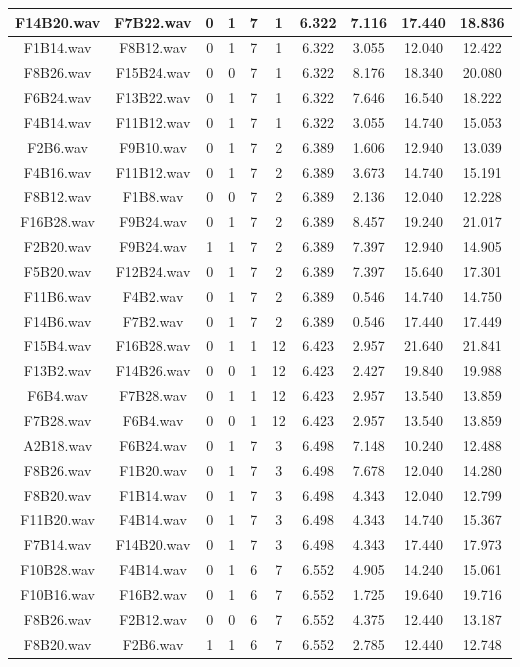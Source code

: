 \documentclass[11pt,a4paper]{book}
\begin{document}
\begin{longtable}[c]{|c|c|c|c|c|c|c|c|c|c|}
F14B20.wav&F7B22.wav&0&1&7&1&6.322&7.116&17.440&18.836\\ \hline
F1B14.wav&F8B12.wav&0&1&7&1&6.322&3.055&12.040&12.422\\ \hline
F8B26.wav&F15B24.wav&0&0&7&1&6.322&8.176&18.340&20.080\\ \hline
F6B24.wav&F13B22.wav&0&1&7&1&6.322&7.646&16.540&18.222\\ \hline
F4B14.wav&F11B12.wav&0&1&7&1&6.322&3.055&14.740&15.053\\ \hline
F2B6.wav&F9B10.wav&0&1&7&2&6.389&1.606&12.940&13.039\\ \hline
F4B16.wav&F11B12.wav&0&1&7&2&6.389&3.673&14.740&15.191\\ \hline
F8B12.wav&F1B8.wav&0&0&7&2&6.389&2.136&12.040&12.228\\ \hline
F16B28.wav&F9B24.wav&0&1&7&2&6.389&8.457&19.240&21.017\\ \hline
F2B20.wav&F9B24.wav&1&1&7&2&6.389&7.397&12.940&14.905\\ \hline
F5B20.wav&F12B24.wav&0&1&7&2&6.389&7.397&15.640&17.301\\ \hline
F11B6.wav&F4B2.wav&0&1&7&2&6.389&0.546&14.740&14.750\\ \hline
F14B6.wav&F7B2.wav&0&1&7&2&6.389&0.546&17.440&17.449\\ \hline
F15B4.wav&F16B28.wav&0&1&1&12&6.423&2.957&21.640&21.841\\ \hline
F13B2.wav&F14B26.wav&0&0&1&12&6.423&2.427&19.840&19.988\\ \hline
F6B4.wav&F7B28.wav&0&1&1&12&6.423&2.957&13.540&13.859\\ \hline
F7B28.wav&F6B4.wav&0&0&1&12&6.423&2.957&13.540&13.859\\ \hline
A2B18.wav&F6B24.wav&0&1&7&3&6.498&7.148&10.240&12.488\\ \hline
F8B26.wav&F1B20.wav&0&1&7&3&6.498&7.678&12.040&14.280\\ \hline
F8B20.wav&F1B14.wav&0&1&7&3&6.498&4.343&12.040&12.799\\ \hline
F11B20.wav&F4B14.wav&0&1&7&3&6.498&4.343&14.740&15.367\\ \hline
F7B14.wav&F14B20.wav&0&1&7&3&6.498&4.343&17.440&17.973\\ \hline
F10B28.wav&F4B14.wav&0&1&6&7&6.552&4.905&14.240&15.061\\ \hline
F10B16.wav&F16B2.wav&0&1&6&7&6.552&1.725&19.640&19.716\\ \hline
F8B26.wav&F2B12.wav&0&0&6&7&6.552&4.375&12.440&13.187\\ \hline
F8B20.wav&F2B6.wav&1&1&6&7&6.552&2.785&12.440&12.748\\ \hline

\end{longtable}
\end{document}
